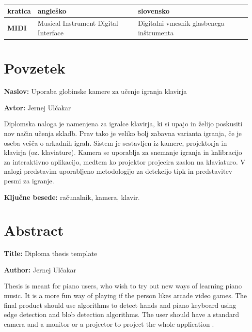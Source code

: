 \documentclass[a4paper,12pt,openright]{book}
\newcommand{\ttitle}{Uporaba globinske kamere za učenje igranja klavirja}
\newcommand{\ttitleEn}{Diploma thesis template}
\newcommand{\tauthor}{Jernej Ulčakar}
\newcommand{\tkeywords}{računalnik, kamera, klavir}
\newcommand{\clearemptydoublepage}{\newpage{\pagestyle{empty}\cleardoublepage}}
\begin{document}
\noindent\begin{tabular}{p{}|p{}|p{}}    %
  {\bf kratica} & {\bf angleško}                              & {\bf slovensko} \\ \hline
  {\bf MIDI}   & Musical Instrument Digital Interface            &Digitalni vmesnik glasbenega inštrumenta \\
\end{tabular}


\clearemptydoublepage

\chapter*{Povzetek}

\noindent\textbf{Naslov:} \ttitle
\bigskip

\noindent\textbf{Avtor:} \tauthor
\bigskip

\noindent Diplomska naloga je namenjena za igralce klavirja, ki si upajo in želijo poskusiti nov način učenja skladb. Prav tako je veliko bolj zabavna varianta igranja, če je oseba vešča o arkadnih igrah. 
Sistem je sestavljen iz kamere, projektorja in klavirja (oz. klaviature). Kamera se uporablja za snemanje igranja in kalibracijo za interaktivno aplikacijo, medtem ko projektor projecira zaslon na klaviaturo. V nalogi predstavim uporabljeno metodologijo za detekcijo tipk in predstavitev pesmi za igranje.


\bigskip

\noindent\textbf{Ključne besede:} \tkeywords.
\clearemptydoublepage

\chapter*{Abstract}

\noindent\textbf{Title:} \ttitleEn
\bigskip

\noindent\textbf{Author:} \tauthor
\bigskip

\noindent Thesis is meant for piano users, who wish to try out new ways of learning piano music. It is a more fun way of playing if the person likes arcade video games.
The final product should use algorithms to detect hands and piano keyboard using edge detection and blob detection algorithms. The user should have a standard camera and a monitor or a projector to project the whole application .
\bigskip
\end{document}
